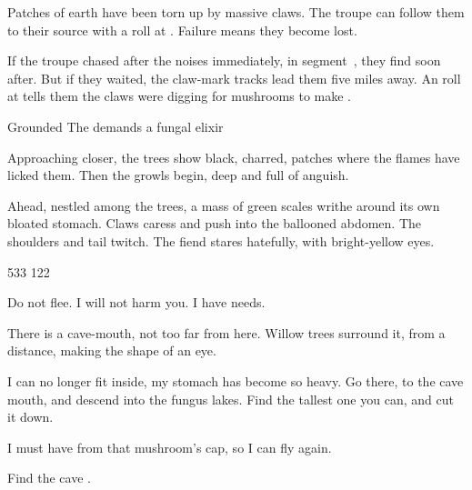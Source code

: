 \documentclass[10pt,twoside]{book}
\begin{document}
Patches of earth have been torn up by massive claws.
The troupe can follow them to their source with a  roll at \tn[6].
Failure means they become lost.

If the troupe chased after the noises immediately, in \gls{segment}~, they find soon after.
But if they waited, the claw-mark tracks lead them five miles away.
An  roll at \tn[12] tells them the claws were digging for mushrooms to make .

{Grounded}%
{The  demands a fungal \gls{elixir}}%
\label{irregularDragon}

Approaching closer, the trees show black, charred, patches where the flames have licked them.
Then the growls begin, deep and full of anguish.

\begin{boxtext}
  Ahead, nestled among the trees, a mass of green scales writhe around its own bloated stomach.
  Claws caress and push into the ballooned abdomen.
  The shoulders and tail twitch.
  The \gls{fiend} stares hatefully, with bright-yellow eyes.
\end{boxtext}

%
  {{5}{3}{3}}%
  {{1}{2}{2}}%
  {
  }%
  {\lucky}%
  {}%
  {\flight \quadruped {}}%

\label{irregularWyrm}

\begin{speechtext}
  Do not flee.
  I will not harm you.
  I have needs.

  There is a cave-mouth, not too far from here.
  Willow trees surround it, from a distance, making the shape of an eye.

  I can no longer fit inside, my stomach has become so heavy.
  Go there, to the cave mouth, and descend into the fungus lakes.
  Find the tallest one you can, and cut it down.

  I must have  from that mushroom's cap, so I can fly again.
\end{speechtext}

Find the cave .
\end{document}
